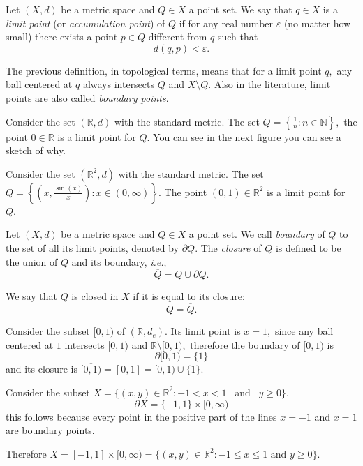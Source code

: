 \documentclass[
	fontsize=10pt, %
	twoside=false, %
	secnumdepth=1, %
]{kaobook}
\begin{document}
\begin{definition}
Let $(X,d)$ be a metric space and $Q\in X$ a point set. We say that $q\in X$ is a \emph{limit point} (or \emph{accumulation point}) of $Q$ if for any real number $\varepsilon$ (no matter how small) there exists a point $p\in Q$ different from $q$ such that $$d(q,p)<\varepsilon.$$
\end{definition}

The previous definition, in topological terms, means that for a limit point $q,$ any ball centered at $q$ always intersects $Q$ and $X\setminus Q$. Also in the literature, limit points are also called \emph{boundary points}.

\begin{example}
Consider the set $(\mathbb{R},d)$ with the standard metric. The set $Q=\left\{\frac{1}{n}: n\in\mathbb{N}\right\},$ the point $0\in\mathbb{R}$ is a limit point for $Q.$ You can see in the next figure you can see a sketch of why.
\end{example}

\begin{example}
Consider the set $(\mathbb{R}^2,d)$ with the standard metric. The set $Q=\left\{\left(x,\frac{\sin(x)}{x}\right): x\in(0,\infty)\right\}.$ The point $(0,1)\in \mathbb{R}^2$ is a limit point for $Q.$
\end{example}

\begin{definition}
Let $(X,d)$ be a metric space and $Q\in X$ a point set. We call \emph{boundary} of $Q$ to the set of all its limit points, denoted by $\partial Q.$ The \emph{closure} of $Q$ is defined to be the union of $Q$ and its boundary, \emph{i.e.}, $$\overline{Q}=Q\cup \partial Q.$$ 

We say that $Q$ is closed in $X$ if it is equal to its closure: $$Q=\overline{Q}.$$
\end{definition}

\begin{example}
Consider the subset $[0,1)$ of $(\mathbb{R},d_e).$ Its limit point is $x=1,$ since any ball centered at $1$ intersects $[0,1)$ and $\mathbb{R}\setminus[ 0,1),$ therefore the boundary of $[0,1)$ is $$\partial [0,1) =\{1\}$$ and its closure is $\overline{[0,1)}=[0,1]=[0,1)\cup\{1\}.$
\end{example}

\begin{example}
Consider the subset $X=\{(x,y)\in\mathbb{R}^2: -1<x<1$ \mbox{ and } $y\geq0\}.$ $$\partial X=\{-1,1\}\times[0,\infty)$$ this follows because every point in the positive part of the lines $x=-1$ and $x=1$ are boundary points. 

Therefore $\overline{X}=[-1,1]\times[0,\infty)=\{(x,y)\in\mathbb{R}^2: -1\leq x\leq 1 \mbox{ and } y\geq 0\}.$
\end{example}
\end{document}
